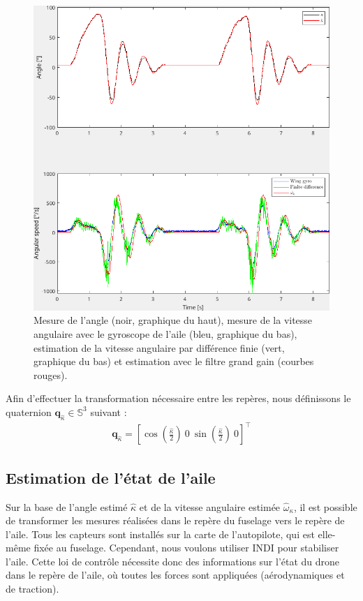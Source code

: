 \begin{figure}[ht!]
\centering
    \includegraphics[width=0.6\columnwidth,angle=0]{figures/highGainFilter.png}
    \caption{Mesure de l'angle (noir, graphique du haut), mesure de la vitesse angulaire avec le gyroscope de l'aile (bleu, graphique du bas), estimation de la vitesse angulaire par différence finie (vert, graphique du bas) et estimation avec le filtre grand gain (courbes rouges).}
    \label{fig:high_gain}
\end{figure}

Afin d'effectuer la transformation nécessaire entre les repères, nous définissons le quaternion $\boldsymbol{q}_{\hat{\kappa}} \in {\mathbb S}^3$ suivant :
\begin{align}
\label{eq:rot_quat}
\boldsymbol{q}_{\hat{\kappa}} =  \left[\cos\left(\frac{\hat{\kappa}}{2}\right) ~ 0 ~ \sin\left(\frac{\hat{\kappa}}{2}\right) ~ 0 \right]^\top
\end{align}


\subsection{Estimation de l'état de l'aile}

Sur la base de l'angle estimé $\hat{\kappa}$ et de la vitesse angulaire estimée $\hat{\omega}_{\kappa}$, il est possible de transformer les mesures réalisées dans le repère du fuselage vers le repère de l'aile. Tous les capteurs sont installés sur la carte de l'autopilote, qui est elle-même fixée au fuselage. Cependant, nous voulons utiliser INDI pour stabiliser l'aile. Cette loi de contrôle nécessite donc des informations sur l'état du drone dans le repère de l'aile, où toutes les forces sont appliquées (aérodynamiques et de traction).

